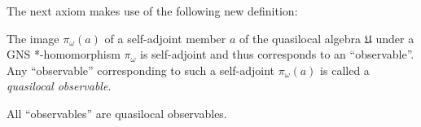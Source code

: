 The next axiom makes use of the following new definition:

\begin{definition}
    \label{def:quasilocal-observable}
    \leanok
    The image $\pi_\omega(a)$ of a self-adjoint member $a$ of the quasilocal algebra $\mathfrak{U}$ under a GNS *-homomorphism $\pi_\omega$ is self-adjoint and thus corresponds to an ``observable''. Any ``observable'' corresponding to such a self-adjoint $\pi_\omega(a)$ is called a \textit{quasilocal observable}.
\end{definition}

\begin{definition}
    \label{def:quasilocal-completeness}
    \leanok
    All ``observables'' are quasilocal observables.
\end{definition}

